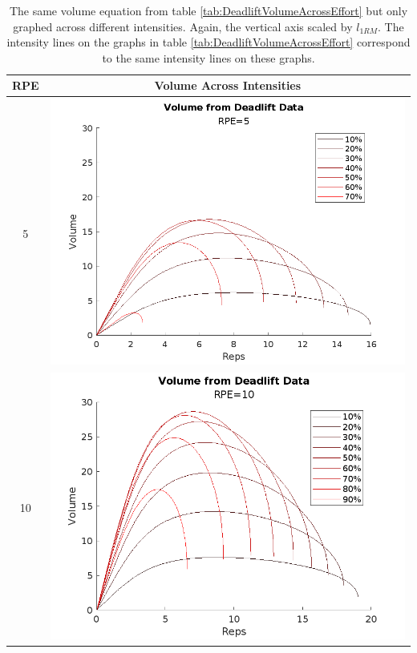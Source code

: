 \begin{table}
    \centering
    \begin{tabular}{c|c}
        RPE & Volume Across Intensities \\
        \hline
        
        5 &
        \includegraphics[width=140mm]{DeadliftVolume/5-2.png} \\
        
        
        10 &
        \includegraphics[width=140mm]{DeadliftVolume/10-2.png} \\
    \end{tabular}
    \caption{The same volume equation from table \ref{tab:DeadliftVolumeAcrossEffort} but only graphed across different intensities. Again, the vertical axis scaled by $l_{1RM}$. The intensity lines on the graphs in table \ref{tab:DeadliftVolumeAcrossEffort} correspond to the same intensity lines on these graphs.}
    \label{tab:DeadliftVolumeAcrossEffortOnlyIntensity}
\end{table}

